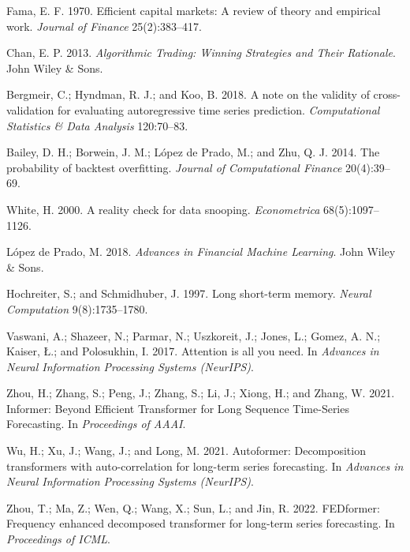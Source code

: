 \documentclass[12pt,a4paper,oneside]{report}
\begin{document}

\begin{thebibliography}{}
Fama, E. F. 1970.
Efficient capital markets: A review of theory and empirical work.
\textit{Journal of Finance} 25(2):383--417.

Chan, E. P. 2013.
\textit{Algorithmic Trading: Winning Strategies and Their Rationale}.
John Wiley \& Sons.

Bergmeir, C.; Hyndman, R. J.; and Koo, B. 2018.
A note on the validity of cross-validation for evaluating autoregressive time series prediction.
\textit{Computational Statistics \& Data Analysis} 120:70--83.

Bailey, D. H.; Borwein, J. M.; López de Prado, M.; and Zhu, Q. J. 2014.
The probability of backtest overfitting.
\textit{Journal of Computational Finance} 20(4):39--69.

White, H. 2000.
A reality check for data snooping.
\textit{Econometrica} 68(5):1097--1126.

López de Prado, M. 2018.
\textit{Advances in Financial Machine Learning}.
John Wiley \& Sons.

Hochreiter, S.; and Schmidhuber, J. 1997.
Long short-term memory.
\textit{Neural Computation} 9(8):1735--1780.

Vaswani, A.; Shazeer, N.; Parmar, N.; Uszkoreit, J.; Jones, L.; Gomez, A. N.; Kaiser, \L.; and Polosukhin, I. 2017.
Attention is all you need.
In \textit{Advances in Neural Information Processing Systems (NeurIPS)}.

Zhou, H.; Zhang, S.; Peng, J.; Zhang, S.; Li, J.; Xiong, H.; and Zhang, W. 2021.
Informer: Beyond Efficient Transformer for Long Sequence Time-Series Forecasting.
In \textit{Proceedings of AAAI}.

Wu, H.; Xu, J.; Wang, J.; and Long, M. 2021.
Autoformer: Decomposition transformers with auto-correlation for long-term series forecasting.
In \textit{Advances in Neural Information Processing Systems (NeurIPS)}.

Zhou, T.; Ma, Z.; Wen, Q.; Wang, X.; Sun, L.; and Jin, R. 2022.
FEDformer: Frequency enhanced decomposed transformer for long-term series forecasting.
In \textit{Proceedings of ICML}.


\end{thebibliography}
\end{document}
